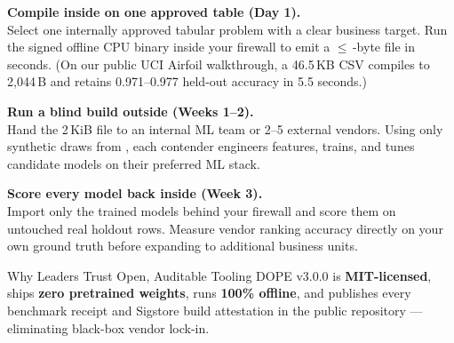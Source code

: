 \documentclass[8.8pt,letterpaper]{article}
\begin{document}
\vspace{3pt}

\noindent
\begin{minipage}[t]{0.478\textwidth}
  \vspace{0pt}
  \vspace{1pt}
  {\fontsize{7.8}{9.8}\selectfont\raggedright
  \noindent{}\;\textbf{Compile inside on one approved table (Day 1).}\\
  Select one internally approved tabular problem with a clear business target. Run the signed offline  CPU binary inside your firewall to emit a $\le$\,-byte file in seconds. (On our public UCI Airfoil walkthrough, a 46.5\,KB CSV compiles to 2,044\,B and retains 0.971--0.977 held-out accuracy in 5.5 seconds.)

  \vspace{3pt}
  \noindent{}\;\textbf{Run a blind build outside (Weeks 1--2).}\\
  Hand the 2\,KiB file to an internal ML team or 2--5 external vendors. Using only synthetic draws from , each contender engineers features, trains, and tunes candidate models on their preferred ML stack.

  \vspace{3pt}
  \noindent{}\;\textbf{Score every model back inside (Week 3).}\\
  Import only the trained models behind your firewall and score them on untouched real holdout rows. Measure vendor ranking accuracy directly on your own ground truth before expanding to additional business units.
  }

  \vspace{3.5pt}
  \begin{execbox}[accent]{Why Leaders Trust Open, Auditable Tooling}
    DOPE v3.0.0 is \textbf{MIT-licensed}, ships \textbf{zero pretrained weights}, runs \textbf{100\% offline}, and publishes every benchmark receipt and Sigstore build attestation in the public repository --- eliminating black-box vendor lock-in.
  \end{execbox}
\end{minipage}\hfill
\end{document}
